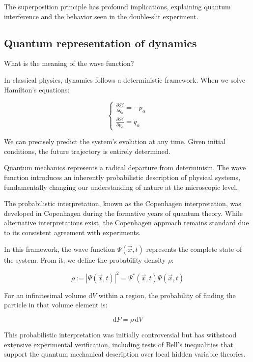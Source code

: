 \documentclass[italian]{HKNdocument}
\begin{document}
The superposition principle has profound implications, explaining quantum interference and the behavior seen in the double-slit experiment.

\subsection{Quantum representation of dynamics}
What is the meaning of the wave function?

In classical physics, dynamics follows a deterministic framework. When we solve Hamilton's equations:

\[
\left\{\begin{array}{l}
\frac{\partial \mathcal{H}}{\partial q_{\alpha}}=-\dot{p}_{\alpha}  \label{eq:1.22}\\
\frac{\partial \mathcal{H}}{\partial p_{\alpha}}=\dot{q}_{\alpha}
\end{array}\right.
\]

We can precisely predict the system's evolution at any time. Given initial conditions, the future trajectory is entirely determined.

Quantum mechanics represents a radical departure from determinism. The wave function introduces an inherently probabilistic description of physical systems, fundamentally changing our understanding of nature at the microscopic level.

The probabilistic interpretation, known as the Copenhagen interpretation, was developed in Copenhagen during the formative years of quantum theory. While alternative interpretations exist, the Copenhagen approach remains standard due to its consistent agreement with experiments.

In this framework, the wave function $\Psi(\vec{x}, t)$ represents the complete state of the system. From it, we define the probability density $\rho$:

\begin{equation}
\rho:=|\Psi(\vec{x}, t)|^{2} = \Psi^*(\vec{x}, t)\Psi(\vec{x}, t) \label{eq:1.23}
\end{equation}

For an infinitesimal volume $\mathrm{d}V$ within a region, the probability of finding the particle in that volume element is:

\begin{equation}
\mathrm{d}P=\rho\,\mathrm{d}V \label{eq:1.24}
\end{equation}

This probabilistic interpretation was initially controversial but has withstood extensive experimental verification, including tests of Bell's inequalities that support the quantum mechanical description over local hidden variable theories.
\end{document}
